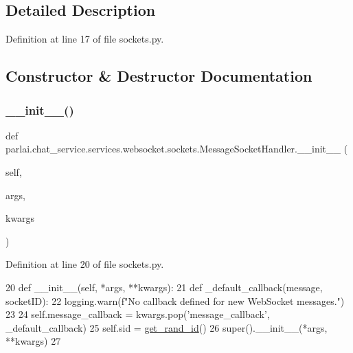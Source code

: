 \subsection{Detailed Description}


Definition at line 17 of file sockets.\+py.



\subsection{Constructor \& Destructor Documentation}
\mbox{\label{classparlai_1_1chat__service_1_1services_1_1websocket_1_1sockets_1_1MessageSocketHandler_a68a930a675ce483852fc323e0f302381}} 
\subsubsection{\texorpdfstring{\+\_\+\+\_\+init\+\_\+\+\_\+()}{\_\_init\_\_()}}
{\footnotesize\ttfamily def parlai.\+chat\+\_\+service.\+services.\+websocket.\+sockets.\+Message\+Socket\+Handler.\+\_\+\+\_\+init\+\_\+\+\_\+ (\begin{DoxyParamCaption}\item[{}]{self,  }\item[{}]{args,  }\item[{}]{kwargs }\end{DoxyParamCaption})}



Definition at line 20 of file sockets.\+py.


\begin{DoxyCode}
20     \textcolor{keyword}{def }\_\_init\_\_(self, *args, **kwargs):
21         \textcolor{keyword}{def }\_default\_callback(message, socketID):
22             logging.warn(f\textcolor{stringliteral}{"No callback defined for new WebSocket messages."})
23 
24         self.message\_callback = kwargs.pop(\textcolor{stringliteral}{'message\_callback'}, \_default\_callback)
25         self.sid = \hyperlink{namespaceparlai_1_1chat__service_1_1services_1_1websocket_1_1sockets_a474be2aef9361e19eacf308fbce1e802}{get\_rand\_id}()
26         super().\_\_init\_\_(*args, **kwargs)
27 
\end{DoxyCode}


